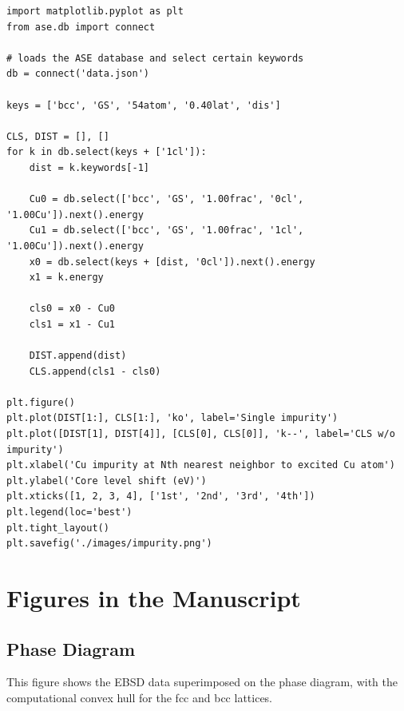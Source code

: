 \documentclass[number, sort&compress, review, 12pt]{elsarticle}
\begin{document}
\begin{verbatim}
import matplotlib.pyplot as plt
from ase.db import connect

# loads the ASE database and select certain keywords
db = connect('data.json')

keys = ['bcc', 'GS', '54atom', '0.40lat', 'dis']

CLS, DIST = [], []
for k in db.select(keys + ['1cl']):
    dist = k.keywords[-1]

    Cu0 = db.select(['bcc', 'GS', '1.00frac', '0cl', '1.00Cu']).next().energy
    Cu1 = db.select(['bcc', 'GS', '1.00frac', '1cl', '1.00Cu']).next().energy
    x0 = db.select(keys + [dist, '0cl']).next().energy
    x1 = k.energy

    cls0 = x0 - Cu0
    cls1 = x1 - Cu1

    DIST.append(dist)
    CLS.append(cls1 - cls0)

plt.figure()
plt.plot(DIST[1:], CLS[1:], 'ko', label='Single impurity')
plt.plot([DIST[1], DIST[4]], [CLS[0], CLS[0]], 'k--', label='CLS w/o impurity')
plt.xlabel('Cu impurity at Nth nearest neighbor to excited Cu atom')
plt.ylabel('Core level shift (eV)')
plt.xticks([1, 2, 3, 4], ['1st', '2nd', '3rd', '4th'])
plt.legend(loc='best')
plt.tight_layout()
plt.savefig('./images/impurity.png')
\end{verbatim}

\section{Figures in the Manuscript}
\label{sec-10}
\subsection{Phase Diagram}
\label{sec-10-1}
This figure shows the EBSD data superimposed on the phase diagram, with the computational convex hull for the fcc and bcc lattices.
\end{document}
